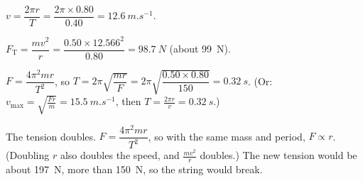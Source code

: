 \documentclass[12pt]{article}
\begin{document}
\ansq
{}
\begin{crit}
\end{crit}
\sample
$v = \dfrac{2\pi r}{T} = \dfrac{2\pi \times 0.80}{0.40} = \qty{12.6}{m.s^{-1}}$.
\begin{crit}
\end{crit}
\sample
$F_\mathrm{T} = \dfrac{mv^2}{r} = \dfrac{0.50 \times 12.566^2}{0.80} = \qty{98.7}{N}$ (about \qty{99}{N}).
\begin{crit}
\end{crit}
\sample
$F = \dfrac{4\pi^2 mr}{T^2}$, so $T = 2\pi\sqrt{\dfrac{mr}{F}} = 2\pi\sqrt{\dfrac{0.50 \times 0.80}{150}}
= \qty{0.32}{s}$. (Or: $v_\mathrm{max} = \sqrt{\frac{Fr}{m}} = \qty{15.5}{m.s^{-1}}$, then
$T = \frac{2\pi r}{v} = \qty{0.32}{s}$.)
\begin{crit}
\end{crit}
\sample
The tension doubles. $F = \dfrac{4\pi^2 mr}{T^2}$, so with the same mass and period, $F \propto r$.
(Doubling $r$ also doubles the speed, and $\frac{mv^2}{r}$ doubles.) The new tension would be about
\qty{197}{N}, more than \qty{150}{N}, so the string would break.
\end{document}
